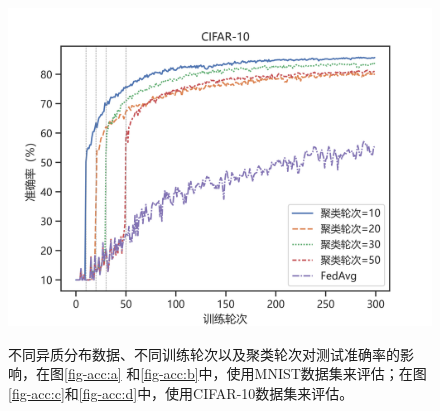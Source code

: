 {\begin{figure}[htb]
{		%
			\centering
			\label{fig-acc:c}
			\includegraphics[width=0.45\linewidth]{figs/cifar-noniid-win-1.png}
	}
	\qquad
	\caption[PPFL+HC准确率评估]{不同异质分布数据、不同训练轮次以及聚类轮次对测试准确率的影响，在图\ref{fig-acc:a} 和\ref{fig-acc:b}中，使用MNIST数据集来评估；在图\ref{fig-acc:c}和\ref{fig-acc:d}中，使用CIFAR-10数据集来评估。}
	\label{fig-acc}
\end{figure}
}

